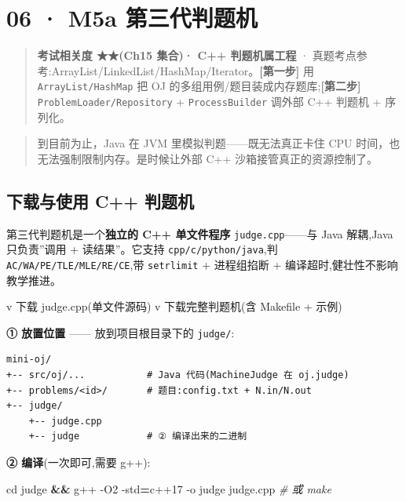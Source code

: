 \documentclass[
  11pt,
]{ctexart}
\newenvironment{Shaded}{\begin{snugshade}}{\end{snugshade}}
\newcommand{\AttributeTok}[1]{\textcolor[rgb]{0.13,0.29,0.53}{#1}}
\newcommand{\BuiltInTok}[1]{#1}
\newcommand{\CommentTok}[1]{\textcolor[rgb]{0.56,0.35,0.01}{\textit{#1}}}
\newcommand{\ExtensionTok}[1]{#1}
\newcommand{\KeywordTok}[1]{\textcolor[rgb]{0.13,0.29,0.53}{\textbf{#1}}}
\newcommand{\NormalTok}[1]{#1}
\newcommand{\OperatorTok}[1]{\textcolor[rgb]{0.81,0.36,0.00}{\textbf{#1}}}
\begin{document}
\hypertarget{m5a-ux7b2cux4e09ux4ee3ux5224ux9898ux673a}{%
\section{06 · M5a
第三代判题机}\label{m5a-ux7b2cux4e09ux4ee3ux5224ux9898ux673a}}

\begin{quote}
\textbf{考试相关度 ★★(Ch15 集合)· C++ 判题机属工程} ·
真题考点参考:ArrayList/LinkedList/HashMap/Iterator。\textbf{{[}第一步{]}}
\KS 用 \texttt{ArrayList/HashMap} 把 OJ
的多组用例/题目装成内存题库;\textbf{{[}第二步{]}}
\GC \texttt{ProblemLoader/Repository} + \texttt{ProcessBuilder} 调外部
C++ 判题机 + 序列化。
\end{quote}

\begin{quote}
到目前为止，Java 在 JVM 里模拟判题------既无法真正卡住 CPU
时间，也无法强制限制内存。是时候让外部 C++ 沙箱接管真正的资源控制了。
\end{quote}

\hypertarget{ux4e0bux8f7dux4e0eux4f7fux7528-c-ux5224ux9898ux673a}{%
\subsection{下载与使用 C++
判题机}\label{ux4e0bux8f7dux4e0eux4f7fux7528-c-ux5224ux9898ux673a}}

第三代判题机是一个\textbf{独立的 C++ 单文件程序}
\texttt{judge.cpp}------与 Java 解耦,Java 只负责''调用 +
读结果''。它支持 \texttt{cpp/c/python/java},判
\texttt{AC/WA/PE/TLE/MLE/RE/CE},带 \texttt{setrlimit} + 进程组掐断 +
编译超时,健壮性不影响教学推进。

v 下载 judge.cpp(单文件源码) v 下载完整判题机(含 Makefile + 示例)

\textbf{① 放置位置} ------ 放到项目根目录下的 \texttt{judge/}:

\begin{verbatim}
mini-oj/
+-- src/oj/...           # Java 代码(MachineJudge 在 oj.judge)
+-- problems/<id>/       # 题目:config.txt + N.in/N.out
+-- judge/
    +-- judge.cpp
    +-- judge            # ② 编译出来的二进制
\end{verbatim}

\textbf{② 编译}(一次即可,需要 g++):

\begin{Shaded}
\begin{Highlighting}[]
\BuiltInTok{cd}\NormalTok{ judge }\KeywordTok{\&\&} \ExtensionTok{g++} \AttributeTok{{-}O2} \AttributeTok{{-}std}\OperatorTok{=}\NormalTok{c++17 }\AttributeTok{{-}o}\NormalTok{ judge judge.cpp   }\CommentTok{\# 或 make}
\end{Highlighting}
\end{Shaded}
\end{document}
